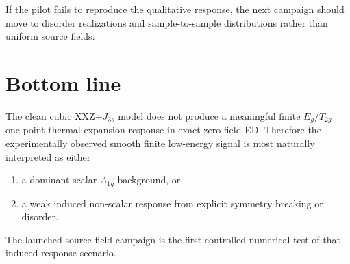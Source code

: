 \documentclass[11pt]{article}
\begin{document}
If the pilot fails to reproduce the qualitative response, the next campaign
should move to disorder realizations and sample-to-sample distributions rather
than uniform source fields.

\section{Bottom line}

The clean cubic XXZ$+J_{3s}$ model does not produce a meaningful finite
$E_g/T_{2g}$ one-point thermal-expansion response in exact zero-field ED.
Therefore the experimentally observed smooth finite low-energy signal is most
naturally interpreted as either
\begin{enumerate}[leftmargin=1.8em]
\item a dominant scalar $A_{1g}$ background, or
\item a weak induced non-scalar response from explicit symmetry breaking or
disorder.
\end{enumerate}
The launched source-field campaign is the first controlled numerical test of
that induced-response scenario.
\end{document}
